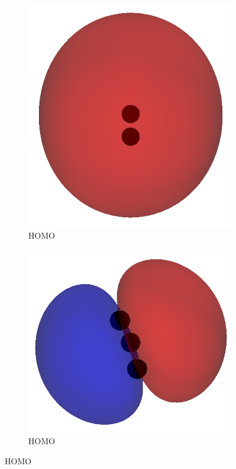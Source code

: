 \documentclass[12pt]{article}
\begin{document}
\begin{figure}[H]
    \centering
    \begin{subfigure}[b]{0.45\textwidth}
        \includegraphics[width=\textwidth]{figures/h2_homo.png}
        \caption{ HOMO}
    \end{subfigure}
    \hfill
    \begin{subfigure}[b]{0.45\textwidth}
        \includegraphics[width=\textwidth]{figures/h2o_homo.png}
        \caption{ HOMO}
    \end{subfigure}


\end{figure}
\end{document}
